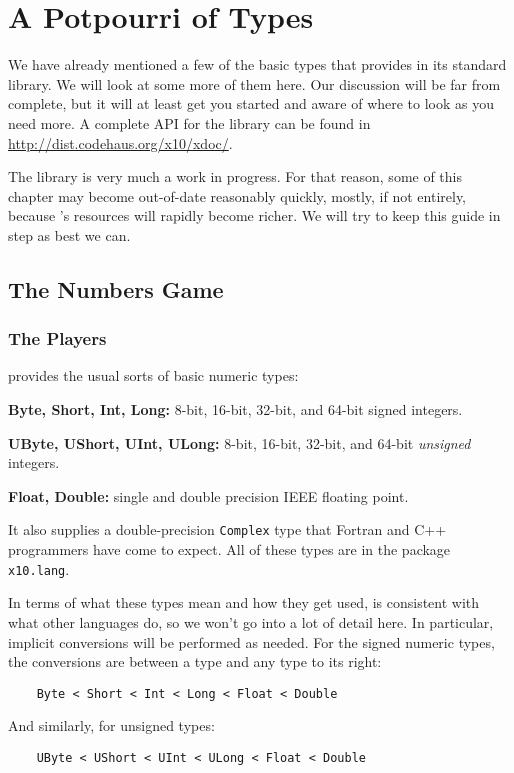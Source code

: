 \chapter{A Potpourri of Types}\label{chp:tsl}

We have already mentioned a few of the basic types that \Xten{} provides in its
standard library.  We will look at some more of them here.  Our discussion will be far
from complete, but it will at least get you started and aware of where to look
as you need more. A complete API for the library can be found in
\href{http://dist.codehaus.org/x10/xdoc/}{http://dist.codehaus.org/x10/xdoc/}.  

The library is very much a work in progress.
For that reason, some of this chapter may become out-of-date reasonably
quickly, mostly, if not entirely, because \Xten's resources will rapidly become
richer. We will try to keep this guide in step as best we can.    

\section{The Numbers Game}\label{sec:tng}
\subsection{The Players}
\Xten{} provides the usual sorts of basic numeric types:
\begin{description}
\item{\bf Byte, Short, Int, Long: }  8-bit, 16-bit, 32-bit, and 64-bit signed integers.
\item{\bf UByte, UShort, UInt, ULong: }  8-bit, 16-bit, 32-bit, and 64-bit {\em unsigned} integers.
\item{\bf Float, Double: } single and double precision IEEE floating point.
\end{description}
It also supplies a double-precision {\tt Complex} type that Fortran and  C++
programmers have come to expect. All of these types are in the package  {\tt
x10.lang}.

In terms of what these types mean and how they get used, \Xten{} is consistent
with what other languages do, so we won't go into a lot of detail here.  In
particular,  implicit conversions will be performed as needed. For the signed
numeric types, the conversions are between a type  and any type to its right:
\begin{verbatim}
    Byte < Short < Int < Long < Float < Double
\end{verbatim}
And similarly, for unsigned types:
\begin{verbatim}
    UByte < UShort < UInt < ULong < Float < Double
\end{verbatim}

